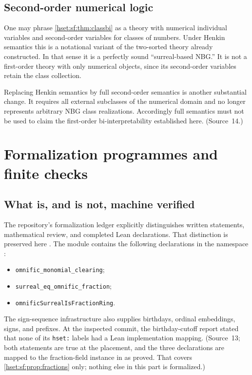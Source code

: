 \documentclass[11pt,letterpaper]{article}
\theoremstyle{definition}
\theoremstyle{remark}
\begin{document}
\subsection{Second-order numerical logic}

One may phrase \cref{hset:sf:thm:classbi} as a theory with numerical individual
variables and second-order variables for classes of numbers. Under Henkin semantics
this is a notational variant of the two-sorted theory already constructed. In that
sense it is a perfectly sound ``surreal-based NBG.'' It is not a first-order theory
with only numerical objects, since its second-order variables retain the class
collection.

Replacing Henkin semantics by full second-order semantics is another substantial
change. It requires all external subclasses of the numerical domain and no longer
represents arbitrary NBG class realizations. Accordingly full semantics must not be
used to claim the first-order bi-interpretability established here. (Source~14.)

\section{Formalization programmes and finite checks}
\label{hset:sf:sec:formal}

\subsection{What is, and is not, machine verified}
\label{hset:sf:sub:machine}

The repository's formalization ledger explicitly distinguishes written statements,
mathematical review, and completed Lean declarations. That distinction is preserved
here \cite{ProveItSF13}. The module
 contains
the following declarations in the namespace
:
\begin{itemize}
\item \texttt{omnific\_monomial\_clearing};
\item \texttt{surreal\_eq\_omnific\_fraction};
\item \texttt{omnificSurrealIsFractionRing}.
\end{itemize}
The sign-sequence infrastructure also supplies birthdays, ordinal embeddings, signs,
and prefixes. At the inspected commit, the birthday-cutoff report stated that none
of its \texttt{hset:} labels had a Lean implementation mapping. (Source~13; both
statements are true at the placement, and the three declarations are mapped to the
fraction-field instance in  as
proved. That covers \cref{hset:sf:prop:fractions} only; nothing else in this part
is formalized.)
\end{document}
